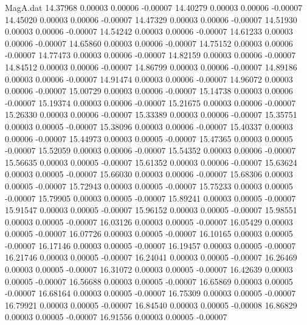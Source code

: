 \begin{filecontents}{MagA.dat}
  14.37968    0.00003    0.00006   -0.00007
  14.40279    0.00003    0.00006   -0.00007
  14.45020    0.00003    0.00006   -0.00007
  14.47329    0.00003    0.00006   -0.00007
  14.51930    0.00003    0.00006   -0.00007
  14.54242    0.00003    0.00006   -0.00007
  14.61233    0.00003    0.00006   -0.00007
  14.65860    0.00003    0.00006   -0.00007
  14.75152    0.00003    0.00006   -0.00007
  14.77473    0.00003    0.00006   -0.00007
  14.82159    0.00003    0.00006   -0.00007
  14.84512    0.00003    0.00006   -0.00007
  14.86799    0.00003    0.00006   -0.00007
  14.89186    0.00003    0.00006   -0.00007
  14.91474    0.00003    0.00006   -0.00007
  14.96072    0.00003    0.00006   -0.00007
  15.00729    0.00003    0.00006   -0.00007
  15.14738    0.00003    0.00006   -0.00007
  15.19374    0.00003    0.00006   -0.00007
  15.21675    0.00003    0.00006   -0.00007
  15.26330    0.00003    0.00006   -0.00007
  15.33389    0.00003    0.00006   -0.00007
  15.35751    0.00003    0.00005   -0.00007
  15.38096    0.00003    0.00006   -0.00007
  15.40337    0.00003    0.00006   -0.00007
  15.44973    0.00003    0.00005   -0.00007
  15.47365    0.00003    0.00005   -0.00007
  15.52059    0.00003    0.00006   -0.00007
  15.54352    0.00003    0.00006   -0.00007
  15.56635    0.00003    0.00005   -0.00007
  15.61352    0.00003    0.00006   -0.00007
  15.63624    0.00003    0.00005   -0.00007
  15.66030    0.00003    0.00006   -0.00007
  15.68306    0.00003    0.00005   -0.00007
  15.72943    0.00003    0.00005   -0.00007
  15.75233    0.00003    0.00005   -0.00007
  15.79905    0.00003    0.00005   -0.00007
  15.89241    0.00003    0.00005   -0.00007
  15.91547    0.00003    0.00005   -0.00007
  15.96152    0.00003    0.00005   -0.00007
  15.98551    0.00003    0.00005   -0.00007
  16.03126    0.00003    0.00005   -0.00007
  16.05429    0.00003    0.00005   -0.00007
  16.07726    0.00003    0.00005   -0.00007
  16.10165    0.00003    0.00005   -0.00007
  16.17146    0.00003    0.00005   -0.00007
  16.19457    0.00003    0.00005   -0.00007
  16.21746    0.00003    0.00005   -0.00007
  16.24041    0.00003    0.00005   -0.00007
  16.26469    0.00003    0.00005   -0.00007
  16.31072    0.00003    0.00005   -0.00007
  16.42639    0.00003    0.00005   -0.00007
  16.56688    0.00003    0.00005   -0.00007
  16.65869    0.00003    0.00005   -0.00007
  16.68164    0.00003    0.00005   -0.00007
  16.75309    0.00003    0.00005   -0.00007
  16.79921    0.00003    0.00005   -0.00007
  16.84540    0.00003    0.00005   -0.00008
  16.86829    0.00003    0.00005   -0.00007
  16.91556    0.00003    0.00005   -0.00007

\end{filecontents}
